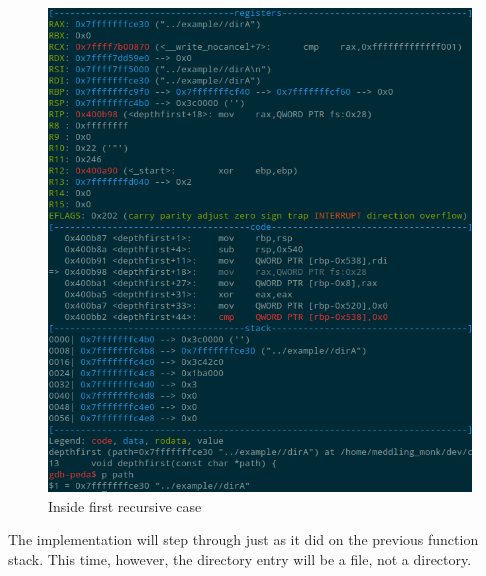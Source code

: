 \documentclass[a4paper,12pt,sffamily]{article}
\begin{document}
\begin{figure}[H]
	\centering
	\includegraphics[width=1\linewidth]{./images/9}
	\caption[inside_first_recursive_case]{Inside first recursive case}
	\label{fig:9}
\end{figure}
The implementation will step through just as it did on the previous function stack. This time, however, the directory entry will be a file, not a directory.
\end{document}
